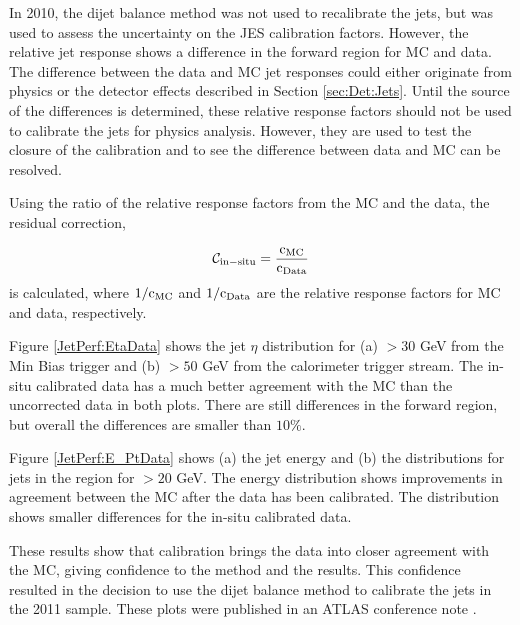 In 2010, the dijet \pt{} balance method was not used to recalibrate the jets, but was used to assess the uncertainty on the JES calibration factors.
However, the relative jet response \cite{ref:EtaInter2010} shows a difference in the forward region for MC and data.
The difference between the data and MC jet responses could either originate from physics or the detector effects described in Section \ref{sec:Det:Jets}. 
Until the source of the differences is determined, these relative response factors should not be used to calibrate the jets for physics analysis.
However, they are used to test the closure of the calibration and to see the difference between data and MC can be resolved.

Using the ratio of the relative response factors from the MC and the data, the residual correction, 

\begin{equation}
\mathcal{C_{\rm{in-situ}}} = \frac{\rm{c_{MC}}}{\rm{c_{Data}}}
\label{JetPerf:ResidualCorrection}
\end{equation}
is calculated, where ${1}/{\rm{c_{MC}}}$ and ${1}/{\rm{c_{Data}}}$ are the relative response factors for MC and data, respectively. 


Figure \ref{JetPerf:EtaData} shows the jet $\eta$ distribution for (a) \pt{} $>30$ GeV from the Min Bias trigger and (b) \pt{}$>50$ GeV from the calorimeter trigger stream. 
The in-situ calibrated data has a much better agreement with the MC than the uncorrected data in both plots. 
There are still differences in the forward region, but overall the differences are smaller than $10\%$.

Figure \ref{JetPerf:E_PtData} shows (a) the jet energy  and  (b) the \pt{} distributions  for jets in the region   for \pt{}$>20$ GeV. 
The energy distribution shows improvements in agreement between the MC after the data has been calibrated.
The \pt{} distribution shows smaller differences for the in-situ calibrated data.

These results show that calibration brings the data into  closer agreement with the MC, giving confidence to the method and the results.
This confidence resulted in the decision to use the dijet \pt{} balance method to calibrate the jets in the 2011 sample. 
These plots were published in an ATLAS conference note \cite{ref:EtaInter2010}.

